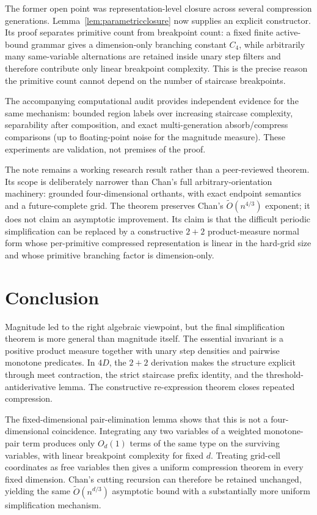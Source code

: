 \documentclass[12pt,a4paper]{article}
\theoremstyle{definition}
\newcommand{\1}{\mathbf 1}
\begin{document}
The former open point was representation-level closure across several compression generations.  Lemma~\ref{lem:parametricclosure} now supplies an explicit constructor.  Its proof separates primitive count from breakpoint count: a fixed finite active-bound grammar gives a dimension-only branching constant $C_4$, while arbitrarily many same-variable alternations are retained inside unary step filters and therefore contribute only linear breakpoint complexity.  This is the precise reason the primitive count cannot depend on the number of staircase breakpoints.

The accompanying computational audit provides independent evidence for the same mechanism: bounded region labels over increasing staircase complexity, separability after composition, and exact multi-generation absorb/compress comparisons (up to floating-point noise for the magnitude measure).  These experiments are validation, not premises of the proof.

The note remains a working research result rather than a peer-reviewed theorem.  Its scope is deliberately narrower than Chan's full arbitrary-orientation machinery: grounded four-dimensional orthants, with exact endpoint semantics and a future-complete grid.  The theorem preserves Chan's $\widetilde O(n^{4/3})$ exponent; it does not claim an asymptotic improvement.  Its claim is that the difficult periodic simplification can be replaced by a constructive $2+2$ product-measure normal form whose per-primitive compressed representation is linear in the hard-grid size and whose primitive branching factor is dimension-only.

\section{Conclusion}

Magnitude led to the right algebraic viewpoint, but the final simplification theorem is more general than magnitude itself.  The essential invariant is a positive product measure together with unary step densities and pairwise monotone predicates.  In $4D$, the $2+2$ derivation makes the structure explicit through meet contraction, the strict staircase prefix identity, and the threshold-antiderivative lemma.  The constructive re-expression theorem closes repeated compression.

The fixed-dimensional pair-elimination lemma shows that this is not a four-dimensional coincidence.  Integrating any two variables of a weighted monotone-pair term produces only $O_d(1)$ terms of the same type on the surviving variables, with linear breakpoint complexity for fixed $d$.  Treating grid-cell coordinates as free variables then gives a uniform compression theorem in every fixed dimension.  Chan's cutting recursion can therefore be retained unchanged, yielding the same $\widetilde O(n^{d/3})$ asymptotic bound with a substantially more uniform simplification mechanism.
\end{document}
